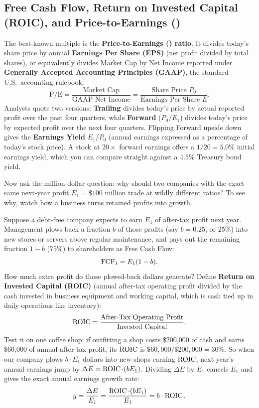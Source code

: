 \subsection{Free Cash Flow, Return on Invested Capital (ROIC), and Price-to-Earnings ()}

The best-known multiple is the \textbf{Price-to-Earnings () ratio}. It divides today's share price by annual \textbf{Earnings Per Share (EPS)} (net profit divided by total shares), or equivalently divides Market Cap by Net Income reported under \textbf{Generally Accepted Accounting Principles (GAAP)}, the standard U.S.\ accounting rulebook:
\[
 \text{P/E} = \frac{\text{Market Cap}}{\text{GAAP Net Income}} = \frac{\text{Share Price } P_0}{\text{Earnings Per Share } E}.
\]
Analysts quote two versions: \textbf{Trailing } divides today's price by actual reported profit over the past four quarters, while \textbf{Forward } ($P_0 / E_1$) divides today's price by expected profit over the next four quarters. Flipping Forward  upside down gives the \textbf{Earnings Yield} $E_1 / P_0$ (annual earnings expressed as a percentage of today's stock price). A stock at $20\times$ forward earnings offers a $1/20 = 5.0\%$ initial earnings yield, which you can compare straight against a $4.5\%$ Treasury bond yield.

Now ask the million-dollar question: why should two companies with the exact same next-year profit $E_1 = \$100$ million trade at wildly different  ratios? To see why, watch how a business turns retained profits into growth.

Suppose a debt-free company expects to earn $E_1$ of after-tax profit next year. Management plows back a fraction $b$ of those profits (say $b = 0.25$, or $25\%$) into new stores or servers above regular maintenance, and pays out the remaining fraction $1 - b$ ($75\%$) to shareholders as Free Cash Flow:
\[
 \operatorname{FCF}_1 = E_1(1 - b).
\]
How much extra profit do those plowed-back dollars generate? Define \textbf{Return on Invested Capital (ROIC)} (annual after-tax operating profit divided by the cash invested in business equipment and working capital, which is cash tied up in daily operations like inventory):
\[
 \operatorname{ROIC} = \frac{\text{After-Tax Operating Profit}}{\text{Invested Capital}}.
\]
Test it on one coffee shop: if outfitting a shop costs \$200,000 of cash and earns \$60,000 of annual after-tax profit, its $\operatorname{ROIC}$ is $\$60{,}000 / \$200{,}000 = 30\%$. So when our company plows $b \cdot E_1$ dollars into new shops earning $\operatorname{ROIC}$, next year's annual earnings jump by $\Delta E = \operatorname{ROIC} \cdot (b E_1)$. Dividing $\Delta E$ by $E_1$ cancels $E_1$ and gives the exact annual earnings growth rate:
\begin{equation}
 g = \frac{\Delta E}{E_1} = \frac{\operatorname{ROIC} \cdot (b E_1)}{E_1} = b \cdot \operatorname{ROIC}.
 \label{eq:growth-plowback-roic}
\end{equation}

